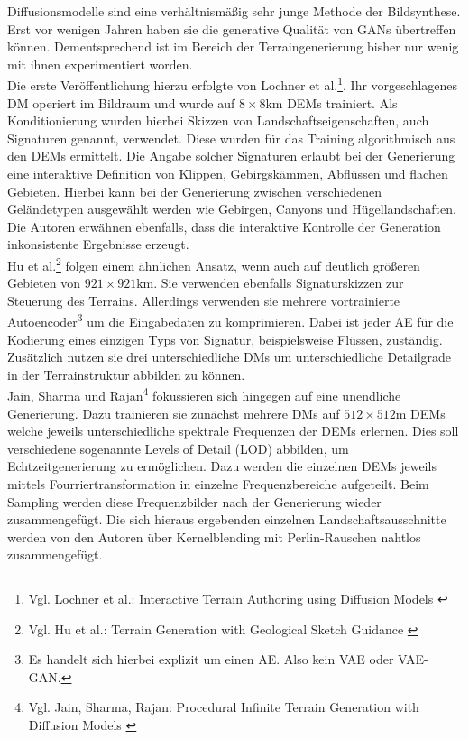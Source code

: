 Diffusionsmodelle sind eine verhältnismäßig sehr junge Methode der Bildsynthese. Erst vor wenigen Jahren haben sie die generative Qualität von \ac{GAN}s übertreffen können. Dementsprechend ist im Bereich der Terraingenerierung bisher nur wenig mit ihnen experimentiert worden. \\
Die erste Veröffentlichung hierzu erfolgte von Lochner et al.\footnote{
    Vgl. Lochner et al.: Interactive Terrain Authoring using Diffusion Models
    \cite{lochner2023interactive}
}. Ihr vorgeschlagenes \ac{DM} operiert im Bildraum und wurde auf $8\times8\text{km}$ \ac{DEM}s trainiert. Als Konditionierung wurden hierbei Skizzen von Landschaftseigenschaften, auch Signaturen genannt, verwendet. Diese wurden für das Training algorithmisch aus den \ac{DEM}s ermittelt. Die Angabe solcher Signaturen erlaubt bei der Generierung eine interaktive Definition von Klippen, Gebirgskämmen, Abflüssen und flachen Gebieten. Hierbei kann bei der Generierung zwischen verschiedenen Geländetypen ausgewählt werden wie Gebirgen, Canyons und Hügellandschaften. Die Autoren erwähnen ebenfalls, dass die interaktive Kontrolle der Generation inkonsistente Ergebnisse erzeugt.\\
Hu et al.\footnote{
    Vgl. Hu et al.: Terrain Generation with Geological Sketch Guidance
    \cite{hu2024terrain}
} folgen einem ähnlichen Ansatz, wenn auch auf deutlich größeren Gebieten von $921\times921\text{km}$. Sie verwenden ebenfalls Signaturskizzen zur Steuerung des Terrains. Allerdings verwenden sie mehrere vortrainierte Autoencoder\footnote{
    Es handelt sich hierbei explizit um einen \ac{AE}. Also kein \ac{VAE} oder VAE-GAN.
} um die Eingabedaten zu komprimieren. Dabei ist jeder \ac{AE} für die Kodierung eines einzigen Typs von Signatur, beispielsweise Flüssen, zuständig. Zusätzlich nutzen sie drei unterschiedliche \ac{DM}s um unterschiedliche Detailgrade in der Terrainstruktur abbilden zu können. \\
Jain, Sharma und Rajan\footnote{
    Vgl. Jain, Sharma, Rajan: Procedural Infinite Terrain Generation with Diffusion Models
    \cite{jain2022adaptive}
} fokussieren sich hingegen auf eine unendliche Generierung. Dazu trainieren sie zunächst mehrere \ac{DM}s auf $512\times512\text{m}$ \ac{DEM}s welche jeweils unterschiedliche spektrale Frequenzen der \ac{DEM}s erlernen. Dies soll verschiedene sogenannte Levels of Detail (LOD) abbilden, um Echtzeitgenerierung zu ermöglichen. Dazu werden die einzelnen \ac{DEM}s jeweils mittels Fourriertransformation in einzelne Frequenzbereiche aufgeteilt. Beim Sampling werden diese Frequenzbilder nach der Generierung wieder zusammengefügt. Die sich hieraus ergebenden einzelnen Landschaftsausschnitte werden von den Autoren über Kernelblending mit Perlin-Rauschen nahtlos zusammengefügt. 



